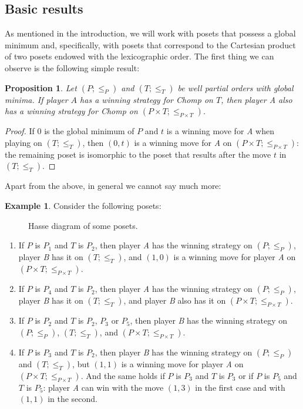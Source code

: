 \documentclass[reqno]{amsart}
\newtheorem{proposition}[theorem]{Proposition}
\theoremstyle{definition}
\theoremstyle{definition}
\newtheorem{example}[theorem]{Example}
\theoremstyle{plain} %
\begin{document}
\subsection{Basic results} As mentioned in the introduction, we will work with posets that possess a global minimum and, specifically, with posets that correspond to the Cartesian product of two posets endowed with the lexicographic order. The first thing we can observe is the following simple result:
\begin{proposition}\label{propsen}
Let $(P;\leq_P)$ and $(T;\leq_T)$ be well partial orders with global minima. If player $A$ has a winning strategy for Chomp on $T$, then player \textit{A} also has a winning strategy for Chomp on $(P\times T;\leq_{P\times T})$.
\end{proposition}\begin{proof}If $0$ is the global minimum of $P$ and $t$ is a winning move for \textit{A} when playing on $(T;\leq_T)$, then $(0,t)$ is a winning move for \textit{A} on $(P\times T;\leq_{P\times T})$: the remaining poset is isomorphic to the poset that results after the move \(t\) in \((T; \leq_T)\).
\end{proof}
Apart from the above, in general we cannot say much more:
\begin{example}
    Consider the following posets:
\begin{figure}[h!]
\def\svgwidth{1\columnwidth}  \caption{Hasse diagram of some posets.}\label{posets}  
\end{figure}
\begin{enumerate}
    \item If $P$ is $P_1$ and $T$ is $P_2$, then player \textit{A} has the winning strategy on $(P;\leq_P)$, player \textit{B} has it on $(T;\leq_T)$, and $(1,0)$ is a winning move for player \textit{A} on $(P\times T;\leq_{P\times T})$.
    \item If $P$ is $P_4$ and $T$ is $P_2$, then player \textit{A} has the winning strategy on $(P;\leq_P)$, player \textit{B} has it on $(T;\leq_T)$, and player \textit{B} also has it on $(P\times T;\leq_{P\times T})$.
    \item If $P$ is $P_2$ and $T$ is $P_2$, $P_3$ or $P_5$, then player \textit{B} has the winning strategy on $(P;\leq_P)$, $(T;\leq_T)$, and $ (P\times T;\leq_{P\times T})$.
    \item If $P $ is $P_3$ and $T$ is $P_2$, then player \textit{B} has the winning strategy on $(P;\leq_P)$ and $(T;\leq_T)$, but $(1,1)$ is a winning move for player \textit{A} on $(P\times T;\leq_{P\times T})$. And the same holds if $P$ is $P_3$ and $T$ is $P_3$ or if $P$ is $P_5$ and $T$ is $P_5$: player \textit{A} can win with the move $(1,3)$ in the first case and with $(1,1)$ in the second.
\end{enumerate}
\end{example}
\end{document}
